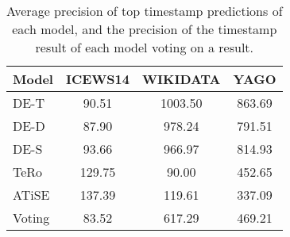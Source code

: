 \begin{table}[htb]
\centering
\begin{minipage}{0.95\columnwidth}
\centering
\caption{Average precision of top timestamp predictions of each model, and the precision of the timestamp result of each model voting on a result.}
\vspace{-3mm}

\begin{tabular}{l|ccc}\hline
Model & ICEWS14 & WIKIDATA & YAGO \\ \hline
DE-T & 90.51 & 1003.50 & 863.69 \\ 
DE-D & 87.90 & 978.24 & 791.51 \\ 
DE-S & 93.66 & 966.97 & 814.93 \\ 
TeRo & 129.75 & 90.00 & 452.65 \\ 
ATiSE & 137.39 & 119.61 & 337.09 \\ \hline 
Voting & 83.52 & 617.29 & 469.21 \\ \hline 

\end{tabular}

\label{tab:timestamp_voting_table}
\end{minipage}
\end{table}

